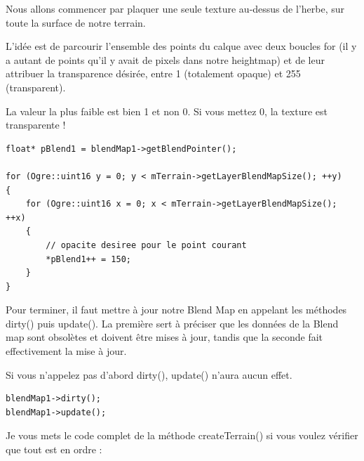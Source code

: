 Nous allons commencer par plaquer une seule texture au-dessus de l'herbe, sur toute la surface de notre terrain.

L'idée est de parcourir l'ensemble des points du calque avec deux boucles for (il y a autant de points qu'il y avait de pixels dans notre heightmap) et de leur attribuer la transparence désirée, entre 1 (totalement opaque) et 255 (transparent).

La valeur la plus faible est bien 1 et non 0. Si vous mettez 0, la texture est transparente !

\begin{lstlisting}[caption={Attribution de la transparence désirée sur tous les points du calque}]
float* pBlend1 = blendMap1->getBlendPointer();

for (Ogre::uint16 y = 0; y < mTerrain->getLayerBlendMapSize(); ++y)
{
    for (Ogre::uint16 x = 0; x < mTerrain->getLayerBlendMapSize(); ++x)
    {   
        // opacite desiree pour le point courant
        *pBlend1++ = 150;
    }
}
\end{lstlisting}















Pour terminer, il faut mettre à jour notre Blend Map en appelant les méthodes dirty() puis update(). La première sert à préciser que les données de la Blend map sont obsolètes et doivent être mises à jour, tandis que la seconde fait effectivement la mise à jour.

Si vous n'appelez pas d'abord dirty(), update() n'aura aucun effet.

\begin{lstlisting}[caption={Mise à jour de la Blend Map}]
blendMap1->dirty();
blendMap1->update();
\end{lstlisting}

Je vous mets le code complet de la méthode createTerrain() si vous voulez vérifier que tout est en ordre :

